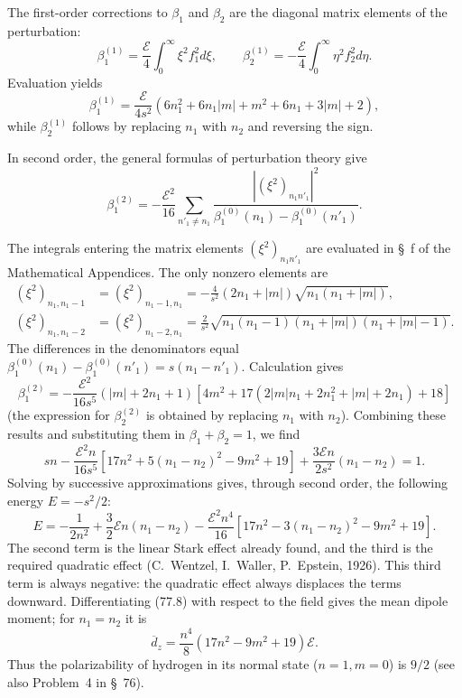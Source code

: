 The first-order corrections to $\beta_1$ and $\beta_2$ are the diagonal matrix elements of the perturbation:
\[
 \beta_1^{(1)}=\frac{\mathcal E}{4}\int_0^\infty\xi^2f_1^2d\xi,\qquad
 \beta_2^{(1)}=-\frac{\mathcal E}{4}\int_0^\infty\eta^2f_2^2d\eta.
\]
Evaluation yields
\[
 \beta_1^{(1)}=\frac{\mathcal E}{4s^2}(6n_1^2+6n_1|m|+m^2+6n_1+3|m|+2),
\]
while $\beta_2^{(1)}$ follows by replacing $n_1$ with $n_2$ and reversing the sign.

In second order, the general formulas of perturbation theory give
\[
 \beta_1^{(2)}=-\frac{\mathcal E^2}{16}\sum_{n'_1\ne n_1}\frac{|(\xi^2)_{n_1n'_1}|^2}{\beta_1^{(0)}(n_1)-\beta_1^{(0)}(n'_1)}.
\]

The integrals entering the matrix elements $(\xi^2)_{n_1n'_1}$ are evaluated in \S~f of the Mathematical Appendices. The only nonzero elements are
\begin{align*}
 (\xi^2)_{n_1,n_1-1}&=(\xi^2)_{n_1-1,n_1}=-\frac4{s^2}(2n_1+|m|)\sqrt{n_1(n_1+|m|)},\\
 (\xi^2)_{n_1,n_1-2}&=(\xi^2)_{n_1-2,n_1}=\frac2{s^2}\sqrt{n_1(n_1-1)(n_1+|m|)(n_1+|m|-1)}.
\end{align*}
The differences in the denominators equal $\beta_1^{(0)}(n_1)-\beta_1^{(0)}(n'_1)=s(n_1-n'_1)$. Calculation gives
\[
 \beta_1^{(2)}=-\frac{\mathcal E^2}{16s^5}(|m|+2n_1+1)[4m^2+17(2|m|n_1+2n_1^2+|m|+2n_1)+18]
\]
(the expression for $\beta_2^{(2)}$ is obtained by replacing $n_1$ with $n_2$). Combining these results and substituting them in $\beta_1+\beta_2=1$, we find
\[
 sn-\frac{\mathcal E^2n}{16s^5}[17n^2+5(n_1-n_2)^2-9m^2+19]+\frac{3\mathcal En}{2s^2}(n_1-n_2)=1.
\]
Solving by successive approximations gives, through second order, the following energy $E=-s^2/2$:
\begin{equation}
 E=-\frac1{2n^2}+\frac32\mathcal En(n_1-n_2)-\frac{\mathcal E^2n^4}{16}[17n^2-3(n_1-n_2)^2-9m^2+19].
 \tag{77.8}
\end{equation}
The second term is the linear Stark effect already found, and the third is the required quadratic effect (C.~Wentzel, I.~Waller, P.~Epstein, 1926). This third term is always negative: the quadratic effect always displaces the terms downward. Differentiating (77.8) with respect to the field gives the mean dipole moment; for $n_1=n_2$ it is
\begin{equation}
 \overline d_z=\frac{n^4}{8}(17n^2-9m^2+19)\mathcal E.
 \tag{77.9}
\end{equation}
Thus the polarizability of hydrogen in its normal state ($n=1,m=0$) is $9/2$ (see also Problem~4 in \S~76).

